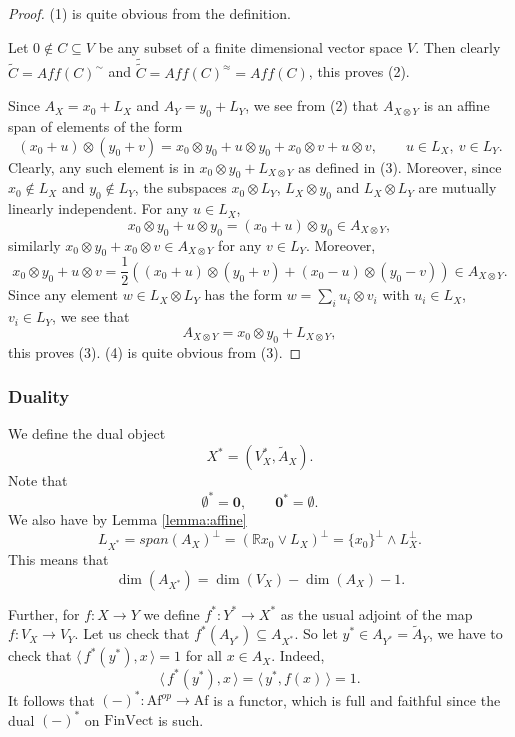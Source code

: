 \documentclass[12pt]{article}
\theoremstyle{definition}
\theoremstyle{remark}
\def\<{\langle\,}
\def\>{\,\rangle}
\def \Af{\mathrm{Af}}
\def \FV{\mathrm{FinVect}}
\def\bX{ X}
\def\bY{ Y}
\begin{document}
\begin{proof} (1) is quite obvious from the definition.

Let $0\notin C\subseteq V$ be any subset of a finite dimensional vector
space $V$. Then clearly $\tilde C=Aff(C)^\sim$ and $\tilde{\tilde
C}=Aff(C)^\approx=Aff(C)$, this proves (2). 

Since $A_\bX=x_0+L_\bX$ and $A_\bY=y_0+L_\bY$, we see from (2) that $A_{\bX\otimes \bY}$
is an affine span of elements of the form
\[
(x_0+u)\otimes (y_0+v)=x_0\otimes y_0+u\otimes y_0+x_0\otimes v+u\otimes v,\qquad u\in L_\bX,\ v\in L_{\bY}.
\]
Clearly, any such element is in $x_0\otimes y_0+L_{\bX\otimes \bY}$ as defined in (3).
Moreover, since $x_0\notin L_\bX$ and $y_0\notin L_\bY$, the subspaces $x_0\otimes L_\bY$,
$L_\bX\otimes y_0$ and $L_\bX\otimes L_\bY$ are mutually linearly independent. For any
$u\in L_\bX$, 
\[
x_0\otimes y_0+u\otimes y_0=(x_0+u)\otimes y_0\in A_{\bX\otimes \bY},
\]
similarly $x_0\otimes y_0+x_0\otimes v\in A_{\bX\otimes \bY}$ for any $v\in L_\bY$.
Moreover,
\[
x_0\otimes y_0+u\otimes v=\frac12\left( (x_0+u)\otimes (y_0+v)+(x_0-u)\otimes
(y_0-v)\right)\in A_{\bX\otimes \bY}.
\]
Since any element  $w\in L_\bX\otimes L_\bY$ has the form $w=\sum_i u_i\otimes v_i$ with $u_i\in L_\bX$, $v_i\in
L_\bY$, we see that 
\[
A_{\bX\otimes \bY}= x_0\otimes y_0+L_{\bX\otimes \bY},
\]
this proves (3). (4) is quite obvious from (3).


\end{proof}

\subsubsection{Duality}

We  define the dual object
\[
\bX^*=(V_\bX^*, \tilde A_\bX).
\]
Note that 
\[
\bm{\emptyset}^*=\bm{0},\qquad \bm{0}^*=\bm{\emptyset}.
\]
We also have by Lemma \ref{lemma:affine}
\[
L_{\bX^*}=span(A_\bX)^\perp= (\mathbb Rx_0\vee L_\bX)^\perp=\{x_0\}^\perp\wedge
L_\bX^\perp.
\]
This means that 
\[
\dim(A_{\bX^*})=\dim(V_\bX)-\dim(A_\bX)-1.
\]

Further, for $f:\bX\to \bY$ we define $f^*:\bY^*\to \bX^*$ as the usual adjoint of the map
$f:V_\bX\to V_\bY$. Let us check that $f^*(A_{\bY^*})\subseteq A_{\bX^*}$. So let $y^*\in
A_{\bY^*}=\tilde A_{\bY}$, we have to check that $\<f^*(y^*),x\>=1$ for all $x\in A_\bX$.
Indeed,
\[
\<f^*(y^*),x\>=\<y^*,f(x)\>=1.
\]
It follows that $(-)^*:\Af^{op}\to \Af$ is a functor, which is full and faithful since the
dual $(-)^*$ on  $\FV$ is such.
\end{document}
